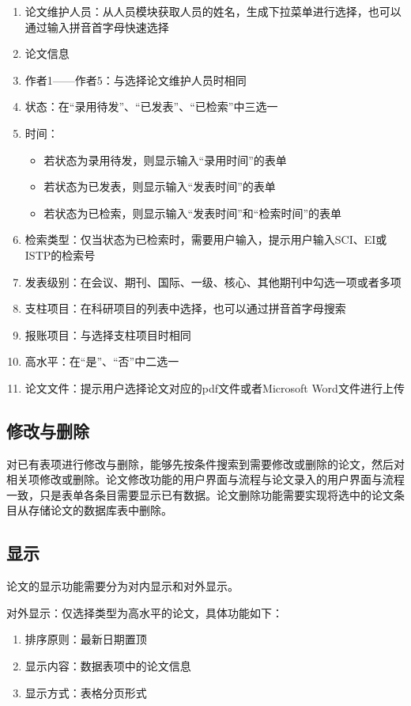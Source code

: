 \begin{enumerate}
\item 论文维护人员：从人员模块获取人员的姓名，生成下拉菜单进行选择，也可以通过输入拼音首字母快速选择
\item 论文信息
\item 作者1——作者5：与选择论文维护人员时相同
\item 状态：在“录用待发”、“已发表”、“已检索”中三选一
\item 时间：
\begin{itemize}
	\item 若状态为录用待发，则显示输入“录用时间”的表单
	\item 若状态为已发表，则显示输入“发表时间”的表单
	\item 若状态为已检索，则显示输入“发表时间”和“检索时间”的表单
\end{itemize}
\item 检索类型：仅当状态为已检索时，需要用户输入，提示用户输入SCI、EI或ISTP的检索号
\item 发表级别：在会议、期刊、国际、一级、核心、其他期刊中勾选一项或者多项
\item 支柱项目：在科研项目的列表中选择，也可以通过拼音首字母搜索
\item 报账项目：与选择支柱项目时相同
\item 高水平：在“是”、“否”中二选一
\item 论文文件：提示用户选择论文对应的pdf文件或者Microsoft Word文件进行上传
\end{enumerate}

\subsection{修改与删除}

对已有表项进行修改与删除，能够先按条件搜索到需要修改或删除的论文，然后对相关项修改或删除。论文修改功能的用户界面与流程与论文录入的用户界面与流程一致，只是表单各条目需要显示已有数据。论文删除功能需要实现将选中的论文条目从存储论文的数据库表中删除。


\subsection{显示}

论文的显示功能需要分为对内显示和对外显示。

对外显示：仅选择类型为高水平的论文，具体功能如下：

\begin{enumerate}
\item 排序原则：最新日期置顶
\item 显示内容：数据表项中的论文信息
\item 显示方式：表格分页形式
\end{enumerate}

